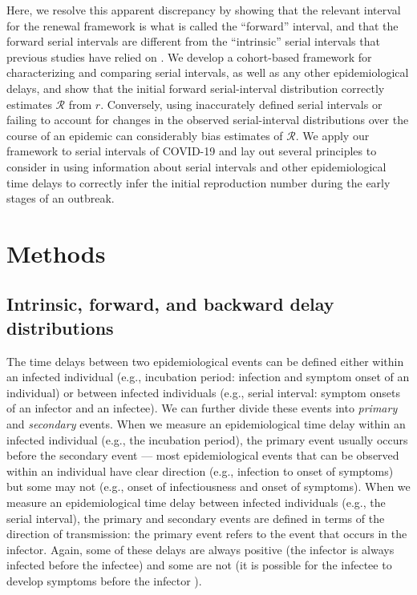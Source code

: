 \documentclass[12pt]{article}
\newcommand{\RR}{\ensuremath{{\mathcal R}}\xspace}
\begin{document}
Here, we resolve this apparent discrepancy by showing that the relevant interval for the renewal framework is what is called the ``forward'' interval, and that the forward serial intervals are different from the ``intrinsic'' serial intervals that previous studies have relied on \citep{svensson2007note,klinkenberg2011correlation,te2013estimating,champredon2018equivalence, britton2019estimation}.
We develop a cohort-based framework for characterizing and comparing serial intervals, as well as any other epidemiological delays, and show that the initial forward serial-interval distribution correctly estimates \RR from $r$.
Conversely, using inaccurately defined serial intervals or failing to account for changes in the observed serial-interval distributions over the course of an epidemic can considerably bias estimates of \RR.
We apply our framework to serial intervals of COVID-19 and lay out several principles to consider in using information about serial intervals and other epidemiological time delays to correctly infer the initial reproduction number during the early stages of an outbreak.

\section{Methods}

\subsection{Intrinsic, forward, and backward delay distributions}

The time delays between two epidemiological events can be defined either within an infected individual (e.g., incubation period: infection and symptom onset of an individual) or between infected individuals (e.g., serial interval: symptom onsets of an infector and an infectee).
We can further divide these events into \emph{primary} and \emph{secondary} events.
When we measure an epidemiological time delay within an infected individual (e.g., the incubation period), the primary event usually occurs before the secondary event ---
most epidemiological events that can be observed within an individual have clear direction (e.g., infection to onset of symptoms) but some may not (e.g., onset of infectiousness and onset of symptoms).
When we measure an epidemiological time delay between infected individuals (e.g., the serial interval), 
the primary and secondary events are defined in terms of the direction of transmission:
the primary event refers to the event that occurs in the infector. 
Again, some of these delays are always positive (the infector is always infected before the infectee) and some are not (it is possible for the infectee to develop symptoms before the infector \citep{he2020temporal}).
\end{document}
